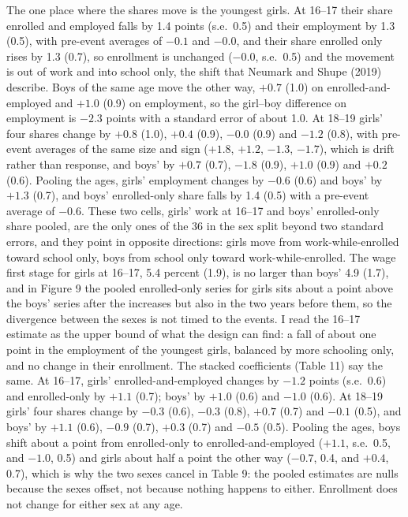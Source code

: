 \documentclass[12pt]{article}
\begin{document}
The one place where the shares move is the youngest girls. At 16--17 their share enrolled and employed falls by 1.4 points (s.e.\ 0.5) and their employment by 1.3 (0.5), with pre-event averages of $-0.1$ and $-0.0$, and their share enrolled only rises by 1.3 (0.7), so enrollment is unchanged ($-0.0$, s.e.\ 0.5) and the movement is out of work and into school only, the shift that Neumark and Shupe (2019) describe. Boys of the same age move the other way, $+0.7$ (1.0) on enrolled-and-employed and $+1.0$ (0.9) on employment, so the girl--boy difference on employment is $-2.3$ points with a standard error of about 1.0. At 18--19 girls' four shares change by $+0.8$ (1.0), $+0.4$ (0.9), $-0.0$ (0.9) and $-1.2$ (0.8), with pre-event averages of the same size and sign ($+1.8$, $+1.2$, $-1.3$, $-1.7$), which is drift rather than response, and boys' by $+0.7$ (0.7), $-1.8$ (0.9), $+1.0$ (0.9) and $+0.2$ (0.6). Pooling the ages, girls' employment changes by $-0.6$ (0.6) and boys' by $+1.3$ (0.7), and boys' enrolled-only share falls by 1.4 (0.5) with a pre-event average of $-0.6$. These two cells, girls' work at 16--17 and boys' enrolled-only share pooled, are the only ones of the 36 in the sex split beyond two standard errors, and they point in opposite directions: girls move from work-while-enrolled toward school only, boys from school only toward work-while-enrolled. The wage first stage for girls at 16--17, 5.4 percent (1.9), is no larger than boys' 4.9 (1.7), and in Figure 9 the pooled enrolled-only series for girls sits about a point above the boys' series after the increases but also in the two years before them, so the divergence between the sexes is not timed to the events. I read the 16--17 estimate as the upper bound of what the design can find: a fall of about one point in the employment of the youngest girls, balanced by more schooling only, and no change in their enrollment. The stacked coefficients (Table 11) say the same. At 16--17, girls' enrolled-and-employed changes by $-1.2$ points (s.e.\ 0.6) and enrolled-only by $+1.1$ (0.7); boys' by $+1.0$ (0.6) and $-1.0$ (0.6). At 18--19 girls' four shares change by $-0.3$ (0.6), $-0.3$ (0.8), $+0.7$ (0.7) and $-0.1$ (0.5), and boys' by $+1.1$ (0.6), $-0.9$ (0.7), $+0.3$ (0.7) and $-0.5$ (0.5). Pooling the ages, boys shift about a point from enrolled-only to enrolled-and-employed ($+1.1$, s.e.\ 0.5, and $-1.0$, 0.5) and girls about half a point the other way ($-0.7$, 0.4, and $+0.4$, 0.7), which is why the two sexes cancel in Table 9: the pooled estimates are nulls because the sexes offset, not because nothing happens to either. Enrollment does not change for either sex at any age.
\end{document}
